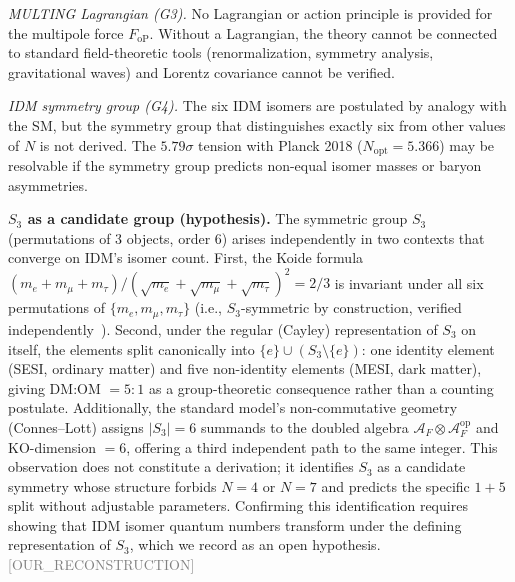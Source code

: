 \documentclass[twocolumn,prd,amsmath,amssymb,floatfix]{revtex4-2}
\newcommand{\reconstruction}{\textcolor{gray}{\small[OUR\_RECONSTRUCTION]}}
\begin{document}
\textit{MULTING Lagrangian (G3).}
No Lagrangian or action principle is provided for the multipole force
$F_\mathrm{oP}$.  Without a Lagrangian, the theory cannot be connected to
standard field-theoretic tools (renormalization, symmetry analysis, gravitational
waves) and Lorentz covariance cannot be verified.

\textit{IDM symmetry group (G4).}
The six IDM isomers are postulated by analogy with the SM, but the symmetry
group that distinguishes exactly six from other values of $N$ is not derived.
The $5.79\sigma$ tension with Planck 2018 ($N_\mathrm{opt} = 5.366$) may be
resolvable if the symmetry group predicts non-equal isomer masses or
baryon asymmetries.

\textbf{$S_3$ as a candidate group (hypothesis).}
The symmetric group $S_3$ (permutations of 3 objects, order 6) arises
independently in two contexts that converge on IDM's isomer count.
First, the Koide formula
$(m_e+m_\mu+m_\tau)/(\sqrt{m_e}+\sqrt{m_\mu}+\sqrt{m_\tau})^2 = 2/3$
is invariant under all six permutations of $\{m_e, m_\mu, m_\tau\}$
(i.e., $S_3$-symmetric by construction, verified independently~\cite{pdg2024}).
Second, under the regular (Cayley) representation of $S_3$ on itself,
the elements split canonically into $\{e\} \cup (S_3 \setminus \{e\})$:
one identity element (SESI, ordinary matter) and five non-identity elements
(MESI, dark matter), giving DM:OM $= 5{:}1$ as a group-theoretic consequence
rather than a counting postulate.
Additionally, the standard model's non-commutative geometry (Connes--Lott)
assigns $|S_3| = 6$ summands to the doubled algebra $\mathcal{A}_F \otimes
\mathcal{A}_F^\mathrm{op}$ and KO-dimension $= 6$, offering a third
independent path to the same integer.
This observation does not constitute a derivation; it identifies $S_3$ as a
candidate symmetry whose structure forbids $N=4$ or $N=7$ and predicts
the specific $1+5$ split without adjustable parameters.
Confirming this identification requires showing that IDM isomer quantum numbers
transform under the defining representation of $S_3$, which we record as an
open hypothesis.
\reconstruction
\end{document}
